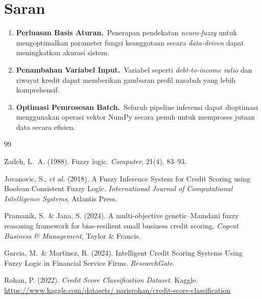 \documentclass[12pt,a4paper]{report}
\begin{document}
\section{Saran}

\begin{enumerate}[label=\arabic*.]
  \item \textbf{Perluasan Basis Aturan.}\ Penerapan pendekatan
        \textit{neuro-fuzzy} untuk mengoptimalkan parameter
        fungsi keanggotaan secara \textit{data-driven} dapat
        meningkatkan akurasi sistem.

  \item \textbf{Penambahan Variabel Input.}\ Variabel seperti
        \textit{debt-to-income ratio} dan riwayat kredit dapat
        memberikan gambaran profil nasabah yang lebih
        komprehensif.

  \item \textbf{Optimasi Pemrosesan Batch.}\ Seluruh pipeline
        inferensi dapat dioptimasi menggunakan operasi vektor
        NumPy secara penuh untuk memproses jutaan data
        secara efisien.
\end{enumerate}

\newpage
{}
\renewcommand{\bibname}{DAFTAR PUSTAKA}

\makeatletter
\renewcommand\@biblabel[1]{}
\makeatother

\begin{thebibliography}{99}
\setlength{\itemindent}{-2.5em}

Zadeh, L.~A. (1988). Fuzzy logic. \textit{Computer}, 21(4),
83--93.

Jovanovic, S., \textit{et al.} (2018). A Fuzzy Inference
System for Credit Scoring using Boolean Consistent Fuzzy
Logic. \textit{International Journal of Computational
Intelligence Systems}, Atlantis Press.

Pramanik, S.\ \& Jana, S. (2024). A multi-objective
genetic--Mamdani fuzzy reasoning framework for bias-resilient
small business credit scoring. \textit{Cogent Business \&
Management}, Taylor \& Francis.

Garcia, M.\ \& Martinez, R. (2024). Intelligent Credit
Scoring Systems Using Fuzzy Logic in Financial Service Firms.
\textit{ResearchGate}.

Rohan, P. (2022). \textit{Credit Score Classification
Dataset}. Kaggle. \url{https://www.kaggle.com/datasets/
parisrohan/credit-score-classification}

\end{thebibliography}
\end{document}
